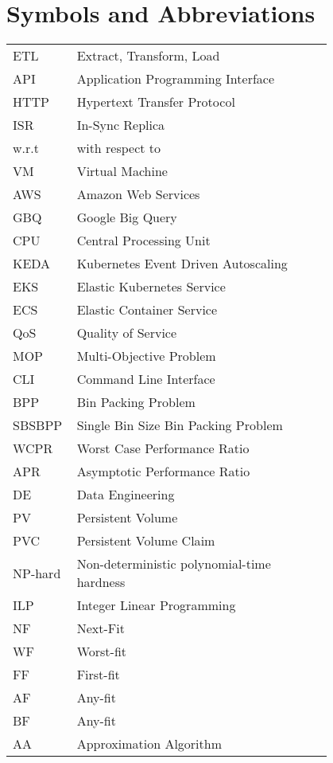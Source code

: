 \chapter*{Symbols and Abbreviations}

\begin{flushleft}
\begin{longtable}{l p{0.8\linewidth}}
ETL      & Extract, Transform, Load\\
API      & Application Programming Interface\\
HTTP     & Hypertext Transfer Protocol \\
ISR      & In-Sync Replica\\
w.r.t    & with respect to\\
VM       & Virtual Machine\\
AWS      & Amazon Web Services\\
GBQ      & Google Big Query\\
CPU      & Central Processing Unit\\
KEDA     & Kubernetes Event Driven Autoscaling\\
EKS      & Elastic Kubernetes Service\\
ECS      & Elastic Container Service\\
QoS      & Quality of Service\\
MOP      & Multi-Objective Problem\\
CLI      & Command Line Interface\\
BPP      & Bin Packing Problem\\
SBSBPP   & Single Bin Size Bin Packing Problem\\
WCPR     & Worst Case Performance Ratio\\
APR      & Asymptotic Performance Ratio\\
DE       & Data Engineering \\
PV       & Persistent Volume \\
PVC      & Persistent Volume Claim \\
NP-hard  & Non-deterministic polynomial-time hardness \\
ILP      & Integer Linear Programming \\
NF       & Next-Fit \\
WF       & Worst-fit \\
FF       & First-fit \\
AF       & Any-fit \\
BF       & Any-fit \\
AA       & Approximation Algorithm \\


\end{longtable}
\end{flushleft}
